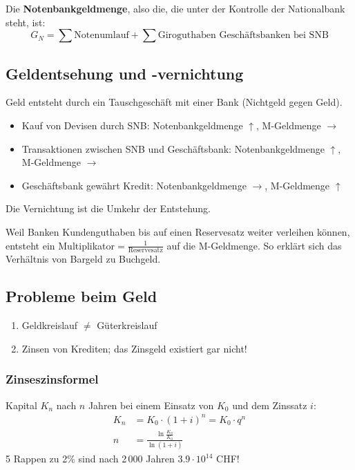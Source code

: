 Die \textbf{Notenbankgeldmenge}, also die, die unter der Kontrolle der Nationalbank steht, ist:
\begin{equation*}
	G_{N} = \sum \mbox{Notenumlauf} + \sum \mbox{Giroguthaben Geschäftsbanken bei SNB}
\end{equation*}

\subsection{Geldentsehung und -vernichtung}
Geld entsteht durch ein Tauschgeschäft mit einer Bank (Nichtgeld gegen Geld).
\begin{itemize}\itemsep0em
	\item Kauf von Devisen durch SNB: Notenbankgeldmenge $\uparrow$, M-Geldmenge $\rightarrow$
	\item Transaktionen zwischen SNB und Geschäftsbank: Notenbankgeldmenge $\uparrow$, M-Geldmenge $\rightarrow$
	\item Geschäftsbank gewährt Kredit: Notenbankgeldmenge $\rightarrow$, M-Geldmenge $\uparrow$
\end{itemize}
Die Vernichtung ist die Umkehr der Entstehung.

Weil Banken Kundenguthaben bis auf einen Reservesatz weiter verleihen können, entsteht ein Multiplikator$ = \frac{1}{\mbox{Reservesatz}}$
auf die M-Geldmenge. So erklärt sich das Verhältnis von Bargeld zu Buchgeld.

\subsection{Probleme beim Geld}
\begin{enumerate}\itemsep0em
	\item Geldkreislauf $\neq$ Güterkreislauf
	\item Zinsen von Krediten; das Zinsgeld existiert gar nicht!
\end{enumerate}
\subsubsection{Zinseszinsformel}
Kapital $K_n$ nach $n$ Jahren bei einem Einsatz von $K_0$ und dem Zinssatz $i$:
\begin{align*}
	K_n& = K_0 \cdot (1 + i)^n = K_0 \cdot q^n\\
	n& = \frac{\ln{\frac{K_n}{K_0}}}{\ln{(1 + i)}}
\end{align*}
5 Rappen zu 2\% sind nach 2\,000 Jahren $3.9 \cdot 10^{14}$ CHF!

